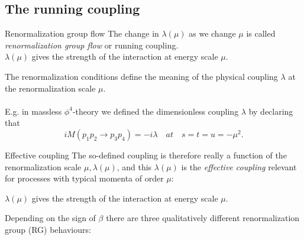 \subsection{The running coupling}
\begin{mybox}{Renormalization group flow}
	The change in $\lambda(\mu)$ as we change $\mu$ is called \emph{renormalization group flow} or running coupling.\\
	$\lambda(\mu)$ gives the strength of the interaction at energy scale $\mu$.
\end{mybox}
The renormalization conditions define the meaning of the physical coupling $\lambda$ at the renormalization scale $\mu$.
\\
\\ E.g. in massless $\phi^4$-theory we defined the dimensionless coupling $\lambda$ by declaring that
\begin{equation}
	i M(p_1 p_2 \rightarrow p_3 p_4) = -i \lambda \quad at \quad s=t=u=-\mu^2.
\end{equation}
\begin{mybox}{Effective coupling}
	The so-defined coupling is therefore really a function of the renormalization scale $\mu, \lambda(\mu)$, and this $\lambda(\mu)$ is the \emph{effective coupling} relevant for processes with typical momenta of order $\mu$:
	\begin{statements}
		$\lambda(\mu)$ gives the strength of the interaction at energy scale $\mu$.
	\end{statements}
\end{mybox}
Depending on the sign of $\beta$ there are three qualitatively different renormalization group (RG) behaviours:
